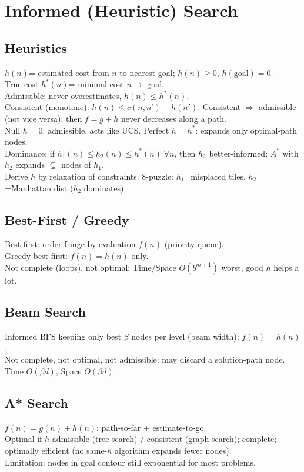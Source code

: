 \section{Informed (Heuristic) Search}

\subsection*{Heuristics}
\( h(n) \)= estimated cost from \(n\) to nearest goal; \( h(n)\ge0 \), \( h(\text{goal})=0 \).\\
True cost \( h^*(n) \)= minimal cost \(n\!\to\!\) goal.\\
Admissible: never overestimates, \( h(n)\le h^*(n) \).\\
Consistent (monotone): \( h(n)\le c(n,n')+h(n') \). Consistent \(\Rightarrow\) admissible (not vice versa); then \(f=g+h\) never decreases along a path.\\
Null \( h=0 \): admissible, acts like UCS. Perfect \( h=h^* \): expands only optimal-path nodes.\\
Dominance: if \( h_1(n)\le h_2(n)\le h^*(n)\;\forall n \), then \(h_2\) better-informed; \(A^*\) with \(h_2\) expands \(\subseteq\) nodes of \(h_1\).\\
Derive \(h\) by relaxation of constraints. 8-puzzle: \(h_1\)=misplaced tiles, \(h_2\)=Manhattan dist (\(h_2\) dominates).

\subsection*{Best-First / Greedy}
Best-first: order fringe by evaluation \( f(n) \) (priority queue).\\
Greedy best-first: \( f(n)=h(n) \) only.\\
Not complete (loops), not optimal; Time/Space \( O(b^{m+1}) \) worst, good \(h\) helps a lot.

\subsection*{Beam Search}
Informed BFS keeping only best \( \beta \) nodes per level (beam width); \( f(n)=h(n) \).\\
Not complete, not optimal, not admissible; may discard a solution-path node.\\
Time \( O(\beta d) \), Space \( O(\beta d) \).

\subsection*{A* Search}
\( f(n)=g(n)+h(n) \): path-so-far + estimate-to-go.\\
Optimal if \(h\) admissible (tree search) / consistent (graph search); complete; optimally efficient (no same-\(h\) algorithm expands fewer nodes).\\
Limitation: nodes in goal contour still exponential for most problems.

